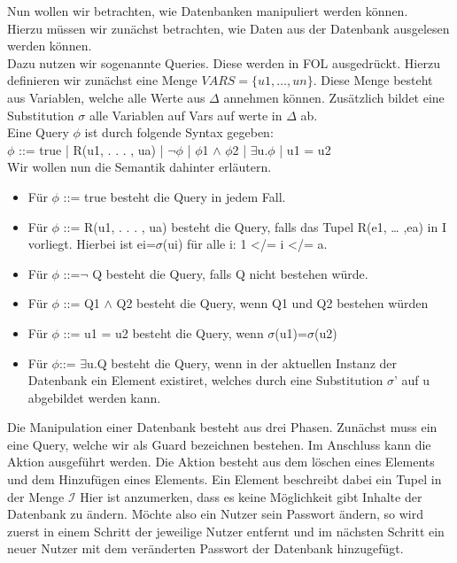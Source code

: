 Nun wollen wir betrachten, wie Datenbanken manipuliert werden können.\\
Hierzu müssen wir zunächst betrachten, wie Daten aus der Datenbank ausgelesen werden können.\\
Dazu nutzen wir sogenannte Queries. Diese werden in FOL ausgedrückt. Hierzu definieren wir zunächst eine Menge $VARS = \{u1,…,un\}$. Diese Menge besteht aus Variablen, welche alle Werte aus ${\Delta}$ annehmen können. Zusätzlich bildet eine Substitution ${\sigma}$ alle Variablen auf Vars auf werte in ${\Delta}$ ab. \\
 Eine Query ${\phi}$ ist durch folgende Syntax gegeben: \\
${\phi}$ ::= true | R(u1, . . . , ua) | ${\neg}{\phi}$ | ${\phi}$1 $\wedge$ ${\phi}$2 | $\exists$u.${\phi}$ | u1 = u2 \\
Wir wollen nun die Semantik dahinter erläutern.
\begin{itemize}
\item Für ${\phi}$ ::= true besteht die Query in jedem Fall.
\item Für ${\phi}$ ::= R(u1, . . . , ua) besteht die Query, falls das Tupel R(e1, … ,ea) in I vorliegt. Hierbei ist ei=${\sigma}$(ui) für alle i: 1 </= i </= a.
\item Für ${\phi}$ ::=${\neg}$ Q besteht die Query, falls Q nicht bestehen würde. 
\item Für ${\phi}$ ::= Q1 $\wedge$ Q2 besteht die Query, wenn Q1 und Q2  bestehen würden
\item Für ${\phi}$ ::= u1 = u2  besteht die Query, wenn ${\sigma}$(u1)=${\sigma}$(u2)
\item Für ${\phi}$::= $\exists$u.Q besteht die Query, wenn in der aktuellen Instanz der Datenbank ein Element existiret, welches durch eine Substitution  ${\sigma}$' auf u abgebildet werden kann. 
\end{itemize}
Die Manipulation einer Datenbank besteht aus drei Phasen. Zunächst muss ein eine Query, welche wir als Guard bezeichnen bestehen. Im Anschluss kann die Aktion ausgeführt werden. Die Aktion besteht aus dem löschen eines Elements und dem Hinzufügen eines Elements. Ein Element beschreibt dabei ein Tupel in der Menge $\mathcal{I}$ Hier ist anzumerken, dass es keine Möglichkeit gibt Inhalte der Datenbank zu ändern. Möchte also ein Nutzer sein Passwort ändern, so wird zuerst in einem Schritt der jeweilige Nutzer entfernt und im nächsten Schritt ein neuer Nutzer mit dem veränderten Passwort der Datenbank hinzugefügt.









